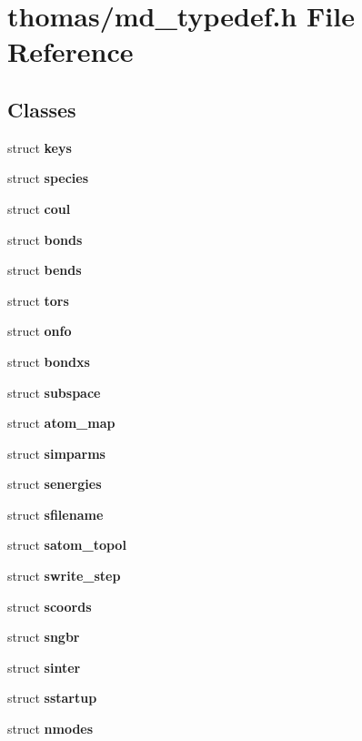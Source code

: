 \section{thomas/md\_\-typedef.h File Reference}
\label{thomas_2md__typedef_8h}
\subsection*{Classes}
\begin{CompactItemize}
\item 
struct {\bf keys}
\item 
struct {\bf species}
\item 
struct {\bf coul}
\item 
struct {\bf bonds}
\item 
struct {\bf bends}
\item 
struct {\bf tors}
\item 
struct {\bf onfo}
\item 
struct {\bf bondxs}
\item 
struct {\bf subspace}
\item 
struct {\bf atom\_\-map}
\item 
struct {\bf simparms}
\item 
struct {\bf senergies}
\item 
struct {\bf sfilename}
\item 
struct {\bf satom\_\-topol}
\item 
struct {\bf swrite\_\-step}
\item 
struct {\bf scoords}
\item 
struct {\bf sngbr}
\item 
struct {\bf sinter}
\item 
struct {\bf sstartup}
\item 
struct {\bf nmodes}
\end{CompactItemize}

